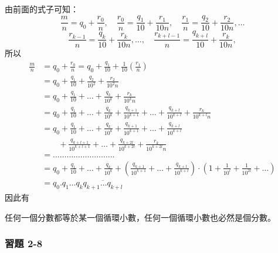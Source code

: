 由前面的式子可知：
\[
\frac{m}{n} = q_0 + \frac{r_0}{n},\quad \frac{r_0}{n} = \frac{q_1}{10}+\frac{r_1}{10n},\quad \frac{r_1}{n} = \frac{q_2}{10}+\frac{r_2}{10n}, \dots
\]
\[
\frac{r_{k-1}}{n} = \frac{q_k}{10}+\frac{r_k}{10n}, \dots, \quad \frac{r_{k+l-1}}{n} = \frac{q_{k+l}}{10}+\frac{r_k}{10n},
\]
所以
\begin{align*}
\frac{m}{n} &= q_0+\frac{r_0}{n} = q_0+\frac{q_1}{10}+\frac{1}{10}\left(\frac{r_1}{n}\right) \\
&= q_0+\frac{q_1}{10}+\frac{q_2}{10^2}+\frac{r_2}{10^2 n} \\
&= q_0+\frac{q_1}{10}+\dots+\frac{q_k}{10^k}+\frac{r_k}{10^k n} \\
&= q_0+\frac{q_1}{10}+\dots+\frac{q_k}{10^k}+\frac{q_{k+1}}{10^{k+1}}+\dots+\frac{q_{k+l}}{10^{k+l}}+\frac{r_k}{10^{k+l}n} \\
&= q_0+\frac{q_1}{10}+\dots+\frac{q_k}{10^k}+\frac{q_{k+1}}{10^{k+1}}+\dots+\frac{q_{k+l}}{10^{k+l}} \\
&\qquad +\frac{q_{k+l+1}}{10^{k+l+1}}+\dots+\frac{q_{k+2l}}{10^{k+2l}}+\frac{r_k}{10^{k+2l}n} \\
&=\dots\dots\dots\dots\dots\dots\dots\dots\dots \\
&= q_0+\frac{q_1}{10}+\dots+\frac{q_k}{10^k} + \left(\frac{q_{k+1}}{10^{k+1}}+\dots+\frac{q_{k+l}}{10^{k+l}}\right)\cdot \left(1+\frac{1}{10^l}+\frac{1}{10^{2l}}+\dots\right) \\
&= q_0.q_1\dots q_k \overline{q_{k+1}\dots q_{k+l}}
\end{align*}
因此有

\begin{theorem}\label{thm:b2_2-6-3}
任何一個分數都等於某一個循環小數，任何一個循環小數也必然是個分數。
\end{theorem}

\subsubsection*{習題 2-8}

